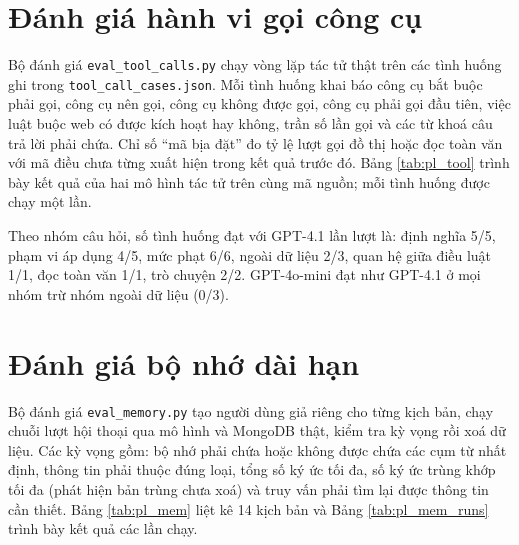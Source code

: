 \documentclass[../DoAn.tex]{subfiles}
\begin{document}


\section{Đánh giá hành vi gọi công cụ}
Bộ đánh giá \texttt{eval\_tool\_calls.py} chạy vòng lặp tác tử thật trên các tình huống ghi trong \texttt{tool\_call\_cases.json}. Mỗi tình huống khai báo công cụ bắt buộc phải gọi, công cụ nên gọi, công cụ không được gọi, công cụ phải gọi đầu tiên, việc luật buộc web có được kích hoạt hay không, trần số lần gọi và các từ khoá câu trả lời phải chứa. Chỉ số ``mã bịa đặt'' đo tỷ lệ lượt gọi đồ thị hoặc đọc toàn văn với mã điều chưa từng xuất hiện trong kết quả trước đó. Bảng \ref{tab:pl_tool} trình bày kết quả của hai mô hình tác tử trên cùng mã nguồn; mỗi tình huống được chạy một lần.



Theo nhóm câu hỏi, số tình huống đạt với GPT-4.1 lần lượt là: định nghĩa 5/5, phạm vi áp dụng 4/5, mức phạt 6/6, ngoài dữ liệu 2/3, quan hệ giữa điều luật 1/1, đọc toàn văn 1/1, trò chuyện 2/2. GPT-4o-mini đạt như GPT-4.1 ở mọi nhóm trừ nhóm ngoài dữ liệu (0/3).

\section{Đánh giá bộ nhớ dài hạn}
Bộ đánh giá \texttt{eval\_memory.py} tạo người dùng giả riêng cho từng kịch bản, chạy chuỗi lượt hội thoại qua mô hình và MongoDB thật, kiểm tra kỳ vọng rồi xoá dữ liệu. Các kỳ vọng gồm: bộ nhớ phải chứa hoặc không được chứa các cụm từ nhất định, thông tin phải thuộc đúng loại, tổng số ký ức tối đa, số ký ức trùng khớp tối đa (phát hiện bản trùng chưa xoá) và truy vấn phải tìm lại được thông tin cần thiết. Bảng \ref{tab:pl_mem} liệt kê 14 kịch bản và Bảng \ref{tab:pl_mem_runs} trình bày kết quả các lần chạy.
\end{document}
